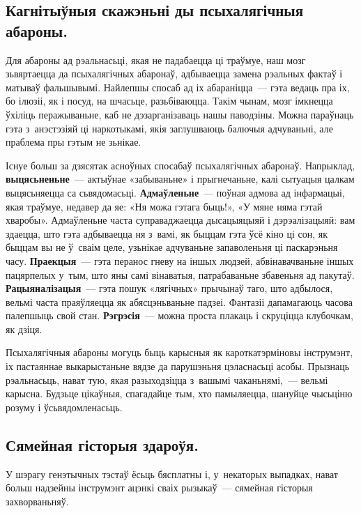 \subsection*{Кагнітыўныя скажэньні ды псыхалягічныя абароны.}

Для абароны ад рэальнасьці, якая не падабаецца ці траўмуе, наш мозг зьвяртаецца да псыхалягічных абаронаў, адбываецца замена рэальных фактаў і матываў фальшывымі. Найлепшы спосаб ад іх абараніцца~--- гэта ведаць пра іх, бо ілюзіі, як і посуд, на шчасьце, разьбіваюцца. Такім чынам, мозг імкнецца ўхіліць перажываньне, каб не дэзарганізаваць нашы паводзіны. Можна параўнаць гэта з~анэстэзіяй ці наркотыкамі, якія заглушваюць балючыя адчуваньні, але праблема пры гэтым не зьнікае.

Існуе больш за дзясятак асноўных спосабаў псыхалягічных абаронаў. Напрыклад, \textbf{выцясьненьне}~--- актыўнае «забываньне» і прыгнечаньне, калі сытуацыя цалкам выцясьняецца са сьвядомасьці. \textbf{Адмаўленьне}~--- поўная адмова ад інфармацыі, якая траўмуе, недавер да яе: «Ня можа гэтага быць!», «У мяне няма гэтай хваробы». Адмаўленьне часта суправаджаецца дысацыяцыяй і дэрэалізацыяй: вам здаецца, што гэта адбываецца ня з~вамі, як быццам гэта ўсё кіно ці сон, як быццам вы не ў~сваім целе, узьнікае адчуваньне запаволеньня ці паскарэньня часу. \textbf{Праекцыя}~--- гэта перанос гневу на іншых людзей, абвінавачваньне іншых пацярпелых у~тым, што яны самі вінаватыя, патрабаваньне збавеньня ад пакутаў. \textbf{Рацыяналізацыя}~--- гэта пошук «лягічных» прычынаў таго, што адбылося, вельмі часта праяўляецца як абясцэньваньне падзеі. Фантазіі дапамагаюць часова палепшыць свой стан. \textbf{Рэгрэсія}~--- можна проста плакаць і скруціцца клубочкам, як дзіця.

Псыхалягічныя абароны могуць быць карысныя як кароткатэрміновы інструмэнт, іх пастаяннае выкарыстаньне вядзе да парушэньня цэласнасьці асобы. Прызнаць рэальнасьць, нават тую, якая разыходзіцца з~вашымі чаканьнямі,~--- вельмі карысна. Будзьце цікаўныя, спагадайце тым, хто памыляецца, шануйце чысьціню розуму і ўсьвядомленасьць.

\subsection*{Сямейная гісторыя здароўя.}

У шэрагу генэтычных тэстаў ёсьць бясплатны і, у~некаторых выпадках, нават больш надзейны інструмэнт ацэнкі сваіх рызыкаў~--- сямейная гісторыя захворваньняў. 


